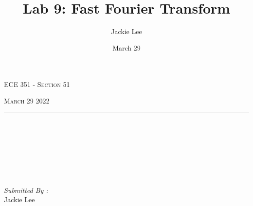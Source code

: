 \documentclass[12pt]{report}
\title{Lab 9: Fast Fourier Transform}
\author{ Jackie Lee}
\date{March 29}
\makeatletter
\let\thetitle\@title
\makeatother
\begin{document}

\begin{titlepage}
	\centering
    \vspace*{0.5 cm}
\begin{center}    \textsc{\Large   ECE 351 - Section 51 }\\[2.0 cm]	\end{center}%
	\textsc{\Large March 29 2022  }\\[0.5 cm]				%
	\rule{\linewidth}{0.2 mm} \\[0.4 cm]
	{ \huge \bfseries \thetitle}\\
	\rule{\linewidth}{0.2 mm} \\[1.5 cm]
	
	\begin{minipage}{0.4\textwidth}
		\begin{flushleft} \large
			\end{flushleft}
			\end{minipage}~
			\begin{minipage}{0.4\textwidth}
            
			\begin{flushright} \large
			\emph{Submitted By :} \\
			Jackie Lee  
		\end{flushright}
           
	\end{minipage}\\[2 cm]
	
    
    
    
    
	
\end{titlepage}


\tableofcontents
\pagebreak

\renewcommand{\thesection}{\arabic{section}}
\end{document}
